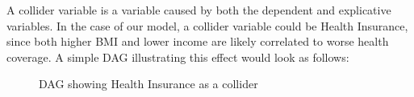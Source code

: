 \newpage


A collider variable is a variable caused by both the dependent and explicative variables. In the case of our model, a collider variable could be Health Insurance, since both higher BMI and lower income are likely correlated to worse health coverage. A simple DAG illustrating this effect would look as follows:

\begin{figure}[H]
    \centering
    \caption{DAG showing Health Insurance as a collider}
    \label{fig:collider}
\end{figure}